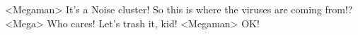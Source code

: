 <Megaman> It's a Noise cluster! 
So this is where the viruses are coming from!? 
<Mega> Who cares! Let's trash it, kid! 
<Megaman> OK! 
